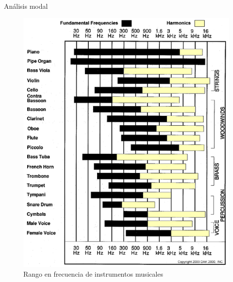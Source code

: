 \documentclass{sintefbeamer}
\begin{document}
\begin{frame}{Análisis modal}

\begin{figure}[H]
    \centering
    \includegraphics[scale=0.5]{images/Modos/RangoInstrumentos.png}
    \caption{Rango en frecuencia de instrumentos musicales}
    \label{fig:RangoInstrumentos}
\end{figure}
\end{frame}
\end{document}
